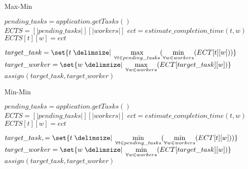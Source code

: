 \onecolumn
\appendix

\begin{algorithm}[H]
  \renewcommand{\thealgorithm}{}
  \caption{Max-Min}
  \begin{algorithmic}
      \STATE $pending\_tasks = application.getTasks()$
          \STATE $ECTS = [|pending\_tasks|][|workers|]$
              \STATE $ect = estimate\_completion\_time(t, w)$
              \STATE $ECTS[t][w] = ect$
            \ENDFOR
          \ENDFOR

          \STATE $target\_task = \set{t \given \max\limits_{\forall t \in pending\_tasks} (\min\limits_{\forall w
          \in workers}(ECT[t][w]))}$
          \STATE $target\_worker = \set{w \given \max\limits_{\forall w \in workers}(ECT[target\_task][w])}$
          \STATE $assign(target\_task, target\_worker)$

        \ENDIF
      \ENDWHILE
  \end{algorithmic}
\end{algorithm}

\begin{algorithm}[H]
  \renewcommand{\thealgorithm}{}
  \caption{Min-Min}
  \begin{algorithmic}
      \STATE $pending\_tasks = application.getTasks()$
          \STATE $ECTS = [|pending\_tasks|][|workers|]$
              \STATE $ect = estimate\_completion\_time(t, w)$
              \STATE $ECTS[t][w] = ect$
            \ENDFOR
          \ENDFOR

          \STATE $target\_task, = \set{t \given \min\limits_{\forall t \in pending\_tasks} (\min\limits_{\forall w
          \in workers}(ECT[t][w]))}$
          \STATE $target\_worker = \set{w \given \min\limits_{\forall w \in workers}(ECT[target\_task][w])}$
          \STATE $assign(target\_task, target\_worker)$

        \ENDIF
      \ENDWHILE
  \end{algorithmic}
\end{algorithm}
